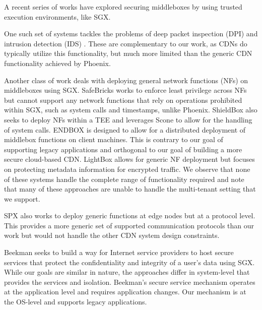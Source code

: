 A recent series of works have explored securing middleboxes by using trusted execution environments, like SGX.

One such set of systems tackles the problems of deep packet inspection (DPI)
and intrusion detection (IDS) \cite{han2017sgx,
DBLP:journals/corr/abs-1802-00508}.  These are complementary to our work, as
CDNs do typically utilize this functionality, but much more limited than the
generic CDN functionality achieved by Phoenix.

Another class of work deals with deploying general network functions (NFs) on
middleboxes using SGX.  SafeBricks \cite{poddar2018safebricks} works to enforce
least privilege across NFs but cannot support any network functions that rely
on operations prohibited within SGX, such as system calls and timestamps,
unlike Phoenix.  ShieldBox \cite{trach2018shieldbox} also seeks to deploy NFs within a TEE and leverages Scone to allow for the handling of system calls.
ENDBOX \cite{goltzsche2018endbox} is designed to allow for a distributed deployment of middlebox functions on client machines.  This is contrary to our goal of supporting legacy applications and orthogonal to our goal of building a more secure cloud-based CDN.
LightBox \cite{DBLP:journals/corr/DuanYW17} allows for generic NF deployment but focuses on protecting metadata information for encrypted traffic.
We observe that none of these systems handle the complete range of functionality required and note that many of these approaches are unable to handle the multi-tenant setting that we support.

SPX \cite{bhardwaj2018spx} also works to deploy generic functions at edge nodes but at a protocol level.
This provides a more generic set of supported communication protocols than our work but would not handle the other CDN system design constraints.

Beekman \cite{beekman2016improving} seeks to build a way for Internet service providers to host secure services that protect the confidentiality and integrity of a user's data using SGX.  While our goals are similar in nature, the approaches differ in system-level that provides the services and isolation.  Beekman's secure service mechanism operates at the application level and requires application changes.  Our mechanism is at the OS-level and supports legacy applications.

